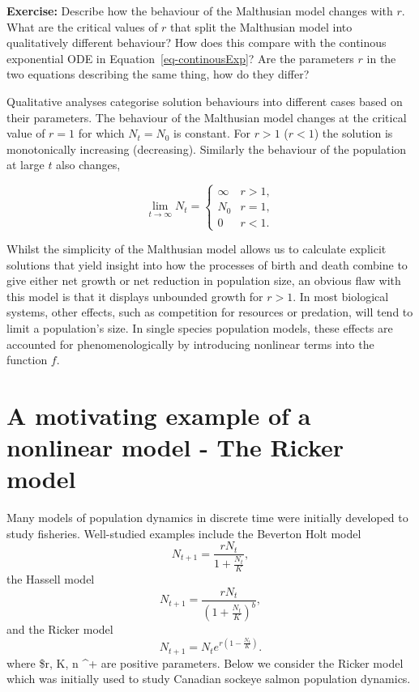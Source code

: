\documentclass[
  letterpaper,
  DIV=11,
  numbers=noendperiod]{scrreprt}
\begin{document}
\textbf{Exercise:} Describe how the behaviour of the Malthusian model
changes with \(r\). What are the critical values of \(r\) that split the
Malthusian model into qualitatively different behaviour? How does this
compare with the continous exponential ODE in
Equation~\ref{eq-continousExp}? Are the parameters \(r\) in the two
equations describing the same thing, how do they differ?

Qualitative analyses categorise solution behaviours into different cases
based on their parameters. The behaviour of the Malthusian model changes
at the critical value of \(r = 1\) for which \(N_t = N_0\) is constant.
For \(r > 1\) (\(r<1\)) the solution is monotonically increasing
(decreasing). Similarly the behaviour of the population at large \(t\)
also changes,

\[
 \lim_{t\rightarrow\infty}N_t =
\left\{
\begin{array}{ll}
\infty & r>1,  \\
N_0& r=1,  \\  
0 & r<1.     
\end{array} \right.
\]

Whilst the simplicity of the Malthusian model allows us to calculate
explicit solutions that yield insight into how the processes of birth
and death combine to give either net growth or net reduction in
population size, an obvious flaw with this model is that it displays
unbounded growth for \(r>1\). In most biological systems, other effects,
such as competition for resources or predation, will tend to limit a
population's size. In single species population models, these effects
are accounted for phenomenologically by introducing nonlinear terms into
the function \(f\).

\section{A motivating example of a nonlinear model - The Ricker
model}\label{a-motivating-example-of-a-nonlinear-model---the-ricker-model}

Many models of population dynamics in discrete time were initially
developed to study fisheries. Well-studied examples include the Beverton
Holt model \[
N_{t+1}=\frac{rN_t}{1+\frac{N_t}{K}},
\] the Hassell model \[
N_{t+1}=\frac{rN_t}{(1+\frac{N_t}{K})^b},
\] and the Ricker model \[
N_{t+1}=N_te^{r(1-\frac{N_t}{K})}.
\] where \$r, K, n \in {}\^{}+ are positive parameters. Below we
consider the Ricker model which was initially used to study Canadian
sockeye salmon population dynamics.
\end{document}
